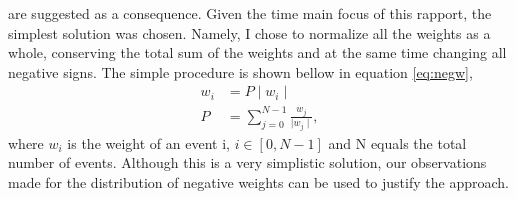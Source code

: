 are suggested as a consequence. Given the time main focus of this rapport, the 
simplest solution was chosen. Namely, I chose to normalize all the weights as a 
whole, conserving the total sum of the weights and at the same time changing all 
negative signs. The simple procedure is shown bellow in equation \ref{eq:negw},
\begin{align}\label{eq:negw}
    w_i & = P \mid w_i \mid\,  \\
    P  & =  \sum_{j=0}^{N-1}\frac{ w_j}{\mid w_j \mid},
\end{align}
where $w_i$ is the weight of an event i, $i \in [0,N-1]$ and N equals the total number of events.
Although this is a very simplistic solution, our observations made for the distribution
of negative weights can be used to justify the approach.


